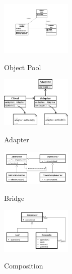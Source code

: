 \begin{figure}[h]
	\begin{center}
		\includegraphics[width=0.3\textwidth]{images/object_pool}
		\label{fig:object_pool}
		\caption{Object Pool}
	\end{center}
\end{figure}

\begin{figure}[h]
	\begin{center}
		\includegraphics[width=0.3\textwidth]{images/adapter}
		\label{fig:adapter}
		\caption{Adapter}
	\end{center}
\end{figure}

\begin{figure}[h]
	\begin{center}
		\includegraphics[width=0.3\textwidth]{images/bridge}
		\label{fig:bridge}
		\caption{Bridge}
	\end{center}
\end{figure}

\begin{figure}[h]
	\begin{center}
		\includegraphics[width=0.3\textwidth]{images/composite}
		\label{fig:composite}
		\caption{Composition}
	\end{center}
\end{figure}

